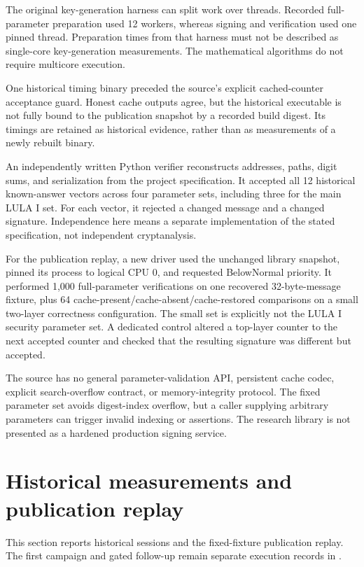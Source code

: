 \documentclass[a4paper,envcountsame,runningheads]{llncs}
\begin{document}
The original key-generation harness can split work over threads. Recorded full-parameter preparation used 12 workers, whereas signing and verification used one pinned thread. Preparation times from that harness must not be described as single-core key-generation measurements. The mathematical algorithms do not require multicore execution.

One historical timing binary preceded the source's explicit cached-counter acceptance guard. Honest cache outputs agree, but the historical executable is not fully bound to the publication snapshot by a recorded build digest. Its timings are retained as historical evidence, rather than as measurements of a newly rebuilt binary.

An independently written Python verifier reconstructs addresses, paths, digit sums, and serialization from the project specification. It accepted all 12 historical known-answer vectors across four parameter sets, including three for the main LULA I set. For each vector, it rejected a changed message and a changed signature. Independence here means a separate implementation of the stated specification, not independent cryptanalysis.

For the publication replay, a new driver used the unchanged library snapshot, pinned its process to logical CPU 0, and requested BelowNormal priority. It performed 1,000 full-parameter verifications on one recovered 32-byte-message fixture, plus 64 cache-present/cache-absent/cache-restored comparisons on a small two-layer correctness configuration. The small set is explicitly not the LULA I security parameter set. A dedicated control altered a top-layer counter to the next accepted counter and checked that the resulting signature was different but accepted.

The source has no general parameter-validation API, persistent cache codec, explicit search-overflow contract, or memory-integrity protocol. The fixed parameter set avoids digest-index overflow, but a caller supplying arbitrary parameters can trigger invalid indexing or assertions. The research library is not presented as a hardened production signing service.

\section{Historical measurements and publication replay}
This section reports historical sessions and the fixed-fixture publication replay. The first campaign and gated follow-up remain separate execution records in .\label{sec:experiments}
\end{document}
